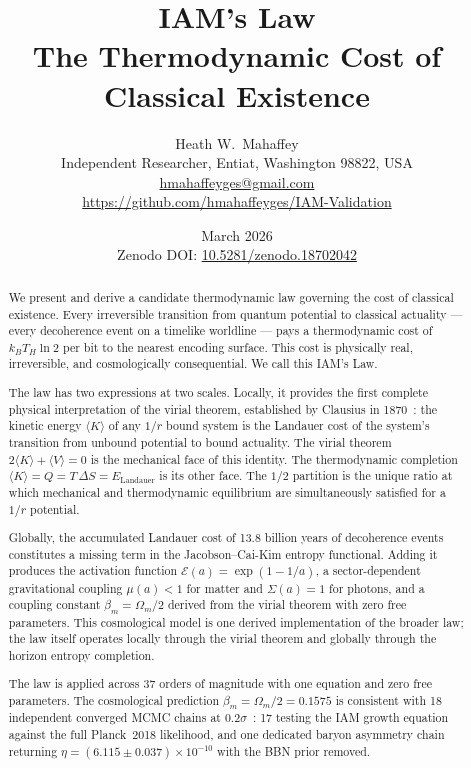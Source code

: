 \documentclass[12pt,a4paper]{article}
\title{\textbf{IAM's Law}\\[0.5em]
\large The Thermodynamic Cost of Classical Existence}
\author{Heath W.\ Mahaffey\\
\small Independent Researcher, Entiat, Washington 98822, USA\\
\small \href{mailto:hmahaffeyges@gmail.com}{hmahaffeyges@gmail.com}\\
\small \url{https://github.com/hmahaffeyges/IAM-Validation}}
\date{March 2026\\
\small Zenodo DOI:
\href{https://doi.org/10.5281/zenodo.18702042}{10.5281/zenodo.18702042}}
\begin{document}
\maketitle

\begin{abstract}
We present and derive a candidate thermodynamic law governing the
cost of classical existence. Every irreversible transition from
quantum potential to classical actuality --- every decoherence event
on a timelike worldline --- pays a thermodynamic cost of $k_B T_H
\ln 2$ per bit to the nearest encoding surface. This cost is
physically real, irreversible, and cosmologically consequential.
We call this IAM's Law.

The law has two expressions at two scales. Locally, it provides the
first complete physical interpretation of the virial theorem,
established by Clausius in 1870~\citep{Clausius1870}: the kinetic
energy $\langle K \rangle$ of any $1/r$ bound system is the Landauer
cost of the system's transition from unbound potential to bound
actuality. The virial theorem $2\langle K \rangle + \langle V
\rangle = 0$ is the mechanical face of this identity. The
thermodynamic completion $\langle K \rangle = Q = T\,\Delta S =
E_\mathrm{Landauer}$ is its other face. The $1/2$ partition is the
unique ratio at which mechanical and thermodynamic equilibrium are
simultaneously satisfied for a $1/r$ potential.

Globally, the accumulated Landauer cost of 13.8 billion years of
decoherence events constitutes a missing term in the
Jacobson--Cai-Kim entropy functional. Adding it produces the
activation function $\mathcal{E}(a) = \exp(1 - 1/a)$, a
sector-dependent gravitational coupling $\mu(a) < 1$ for matter
and $\Sigma(a) = 1$ for photons, and a coupling constant $\beta_m
= \Omega_m/2$ derived from the virial theorem with zero free
parameters. This cosmological model is one derived implementation
of the broader law; the law itself operates locally through the
virial theorem and globally through the horizon entropy completion.

The law is applied across 37 orders of magnitude with one equation
and zero free parameters. The cosmological prediction $\beta_m =
\Omega_m/2 = 0.1575$ is consistent with 18 independent converged
MCMC chains at $0.2\sigma$~\citep{PlanckVI2020}: 17 testing the
IAM growth equation against the full Planck~2018 likelihood, and
one dedicated baryon asymmetry chain returning $\eta =
(6.115 \pm 0.037)\times10^{-10}$ with the BBN prior removed.
\end{abstract}
\end{document}
